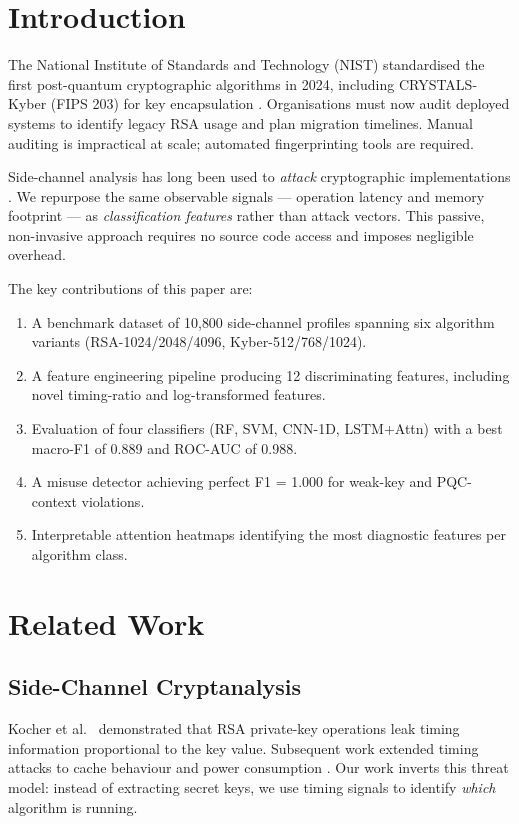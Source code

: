 \documentclass[conference]{IEEEtran}
\begin{document}
\section{Introduction}

The National Institute of Standards and Technology (NIST) standardised
the first post-quantum cryptographic algorithms in 2024, including
CRYSTALS-Kyber (FIPS 203) for key encapsulation \cite{nist_fips203}.
Organisations must now audit deployed systems to identify legacy RSA usage
and plan migration timelines.
Manual auditing is impractical at scale; automated fingerprinting tools
are required.

Side-channel analysis has long been used to \emph{attack} cryptographic
implementations \cite{kocher1996timing}.
We repurpose the same observable signals — operation latency and memory
footprint — as \emph{classification features} rather than attack vectors.
This passive, non-invasive approach requires no source code access and
imposes negligible overhead.

The key contributions of this paper are:
\begin{enumerate}
  \item A benchmark dataset of 10{,}800 side-channel profiles spanning
        six algorithm variants (RSA-1024/2048/4096, Kyber-512/768/1024).
  \item A feature engineering pipeline producing 12 discriminating
        features, including novel timing-ratio and log-transformed features.
  \item Evaluation of four classifiers (RF, SVM, CNN-1D, LSTM+Attn)
        with a best macro-F1 of 0.889 and ROC-AUC of 0.988.
  \item A misuse detector achieving perfect F1 = 1.000 for weak-key
        and PQC-context violations.
  \item Interpretable attention heatmaps identifying the most diagnostic
        features per algorithm class.
\end{enumerate}

\section{Related Work}

\subsection{Side-Channel Cryptanalysis}
Kocher et al.\ \cite{kocher1996timing} demonstrated that RSA private-key
operations leak timing information proportional to the key value.
Subsequent work extended timing attacks to cache behaviour \cite{bernstein2005cache}
and power consumption \cite{mangard2007power}.
Our work inverts this threat model: instead of extracting secret keys,
we use timing signals to identify \emph{which} algorithm is running.
\end{document}
